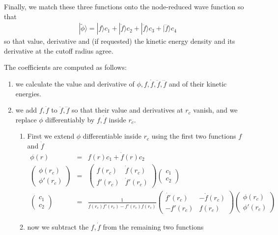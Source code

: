 \documentclass[11pt,a4paper]{report}
\begin{document}
Finally, we match these three functions onto the node-reduced wave
function so that
\begin{eqnarray}
|\tilde{\phi}\rangle=|f\rangle c_1 
+|\dot{f}\rangle c_2
+|\ddot{f}\rangle c_3
+|\dddot{f}\rangle c_4
\end{eqnarray}
so that value, derivative and (if requested) the kinetic energy
density and its derivative at the cutoff radius agree.

The coefficients are computed as follows:
\begin{enumerate}
\item we calculate the value and derivative of
  $\phi,f,\dot{f},\ddot{f},\dddot{f}$ and of their kinetic energies.
\item we add $f,\dot{f}$ to $\ddot{f},\dddot{f}$ so that their value
  and derivatives at $r_c$ vanish, and we replace $\phi$
  differentiably by $f,\dot{f}$ inside $r_c$.
\begin{enumerate}
\item First we extend $\phi$ differentiable inside $r_c$ using the
  first two functions $f$ and $\dot{f}$
\begin{eqnarray}
\phi(r)&=&f(r)c_1 + \dot{f}(r)c_2
\\
\left(\begin{array}{c}\phi(r_c)\\\phi'(r_c)\end{array}\right)
&=&
\left(\begin{array}{cc}f(r_c)&\dot{f}(r_c)\\f'(r_c)&\dot{f}'(r_c)\end{array}\right)
\left(\begin{array}{c}c_1\\c_2\end{array}\right)
\nonumber\\
\left(\begin{array}{c}c_1\\c_2\end{array}\right)
&=&
\frac{1}{f(r_c)\dot{f'}(r_c)-f'(r_c)\dot{f}(r_c)}
\left(\begin{array}{cc}\dot{f'}(r_c)&-\dot{f}(r_c)\\-f'(r_c)&f(r_c)\end{array}\right)
\left(\begin{array}{c}\phi(r_c)\\\phi'(r_c)\end{array}\right)
\end{eqnarray}
%
\item now we subtract the $f,\dot{f}$ from the remaining two functions

\end{enumerate}
\end{enumerate}
\end{document}
